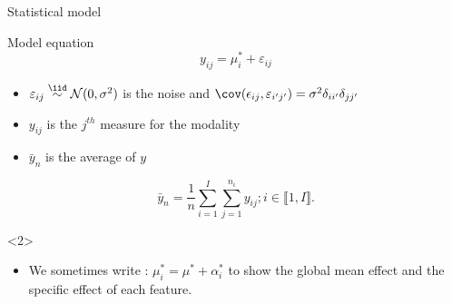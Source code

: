\documentclass[unknownkeysallowed]{beamer}
\begin{document}

\begin{frame}{Statistical model}
\begin{alertblock}{Model equation}
\[y_{ij}=\mu_i^*+\varepsilon_{ij}\]
\end{alertblock}

\medskip

 \begin{itemize}
        \item $\varepsilon_{ij} \overset{\iid}{\sim} \mathcal{N}(0,\sigma^2) $ is the noise
and $\cov(\epsilon_{ij},\varepsilon_{i'j'})=\sigma^2 \delta_{ii'} \delta_{jj'} $
        \item $y_{ij}$ is the $j^{th}$ measure for the modality
        \item $\bar{y}_n$ is the average of $y$ \ie
    \end{itemize}
 \[
\bar{y}_n= \frac{1}{n} \sum_{i=1}^I \sum_{j=1}^{n_i}y_{ij} ; i\in \llbracket 1,I \rrbracket. \]

\begin{onlyenv}<2>
\begin{itemize}
    \item  We sometimes  write : $\mu^*_i=\mu^*+\alpha^*_i $ to show the global mean effect and the specific effect of each feature.
\end{itemize}
\end{onlyenv}

\end{frame}

\end{document}
